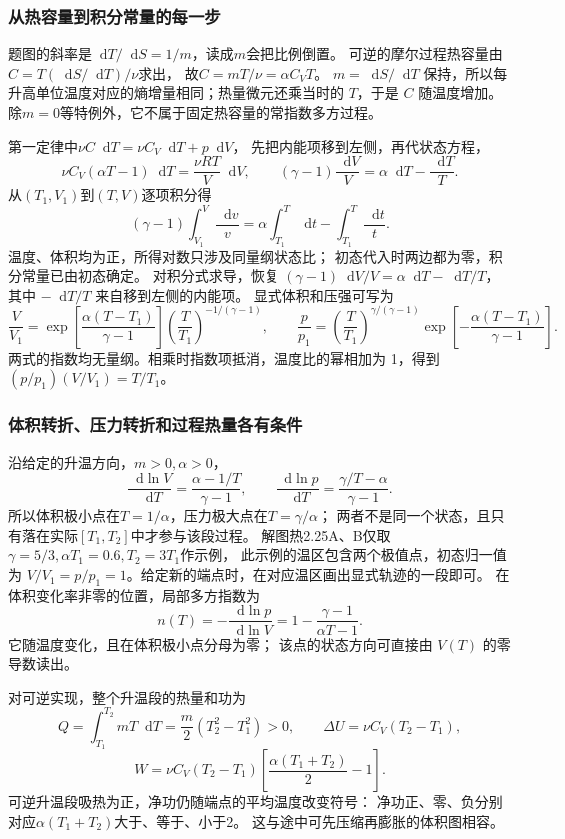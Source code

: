 \documentclass[UTF8,fontset=fandol,a4paper,11pt]{ctexart}
\newcommand{\dd}{\mathop{}\!\mathrm{d}}
\begin{document}
\subsubsection*{从热容量到积分常量的每一步}
题图的斜率是$\dd T/\dd S=1/m$，读成$m$会把比例倒置。
可逆的摩尔过程热容量由$C=T(\dd S/\dd T)/\nu$求出，
故$C=mT/\nu=\alpha C_VT$。
$m=\dd S/\dd T$ 保持，所以每升高单位温度对应的熵增量相同；热量微元还乘当时的 $T$，于是 $C$ 随温度增加。
除$m=0$等特例外，它不属于固定热容量的常指数多方过程。

第一定律中$\nu C\dd T=\nu C_V\dd T+p\dd V$，
先把内能项移到左侧，再代状态方程，
\[
\nu C_V(\alpha T-1)\dd T
=\frac{\nu RT}{V}\dd V,\qquad
(\gamma-1)\frac{\dd V}{V}
=\alpha\dd T-\frac{\dd T}{T}.
\]
从$(T_1,V_1)$到$(T,V)$逐项积分得
\[
(\gamma-1)\int_{V_1}^{V}\frac{\dd v}{v}
=\alpha\int_{T_1}^{T}\dd t-\int_{T_1}^{T}\frac{\dd t}{t}.
\]
温度、体积均为正，所得对数只涉及同量纲状态比；
初态代入时两边都为零，积分常量已由初态确定。
对积分式求导，恢复 $(\gamma-1)\dd V/V=\alpha\dd T-\dd T/T$，其中 $-\dd T/T$ 来自移到左侧的内能项。
显式体积和压强可写为
\[
\frac V{V_1}
=\exp\!\left[\frac{\alpha(T-T_1)}{\gamma-1}\right]
\left(\frac T{T_1}\right)^{-1/(\gamma-1)},\qquad
\frac p{p_1}
=\left(\frac T{T_1}\right)^{\gamma/(\gamma-1)}
\exp\!\left[-\frac{\alpha(T-T_1)}{\gamma-1}\right].
\]
两式的指数均无量纲。相乘时指数项抵消，温度比的幂相加为 1，得到 $(p/p_1)(V/V_1)=T/T_1$。

\subsubsection*{体积转折、压力转折和过程热量各有条件}
沿给定的升温方向，$m>0,\alpha>0$，
\[
\frac{\dd\ln V}{\dd T}=\frac{\alpha-1/T}{\gamma-1},\qquad
\frac{\dd\ln p}{\dd T}=\frac{\gamma/T-\alpha}{\gamma-1}.
\]
所以体积极小点在$T=1/\alpha$，压力极大点在$T=\gamma/\alpha$；
两者不是同一个状态，且只有落在实际$[T_1,T_2]$中才参与该段过程。
解图热2.25A、B仅取$\gamma=5/3,\alpha T_1=0.6,T_2=3T_1$作示例，
此示例的温区包含两个极值点，初态归一值为 $V/V_1=p/p_1=1$。给定新的端点时，在对应温区画出显式轨迹的一段即可。
在体积变化率非零的位置，局部多方指数为
\[
n(T)=-\frac{\dd\ln p}{\dd\ln V}
=1-\frac{\gamma-1}{\alpha T-1}.
\]
它随温度变化，且在体积极小点分母为零；
该点的状态方向可直接由 $V(T)$ 的零导数读出。

对可逆实现，整个升温段的热量和功为
\[
Q=\int_{T_1}^{T_2}mT\dd T
=\frac m2(T_2^2-T_1^2)>0,\qquad
\Delta U=\nu C_V(T_2-T_1),
\]
\[
W=\nu C_V(T_2-T_1)
\left[\frac{\alpha(T_1+T_2)}2-1\right].
\]
可逆升温段吸热为正，净功仍随端点的平均温度改变符号：
净功正、零、负分别对应$\alpha(T_1+T_2)$大于、等于、小于2。
这与途中可先压缩再膨胀的体积图相容。
\end{document}
